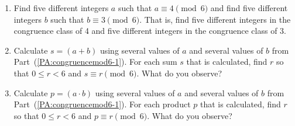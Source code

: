 \begin{previewactivity} \label{PA:congruencemod6} \hfill
\begin{enumerate}
\item Find five different integers  $a$  such that  $a \equiv 4 \pmod 6$ and find five different integers  $b$  such that  $b \equiv 3 \pmod 6$.  That is, find five different integers in the congruence class of  4  and five different integers in the congruence class of 3.  
\label{PA:congruencemod6-1}


\item Calculate  $s = \left( {a + b} \right)$ using several values of  $a$  and several values of  $b$ from Part~(\ref{PA:congruencemod6-1}). 
For each sum $s$ that is calculated, find  $r$  so that  $0 \leq r < 6$ and  
$s \equiv r \pmod 6$.  What do you observe?

\item Calculate  $p = \left( {a \cdot b} \right)$ using several values of  $a$  
and several values of  $b$  from 
Part~(\ref{PA:congruencemod6-1}).  For each product $p$ that is calculated, find  $r$  so that  
$0 \leq r < 6$ and  $p \equiv r \pmod 6$.  What do you observe?
\end{enumerate}
\end{previewactivity}
\hbreak
%
